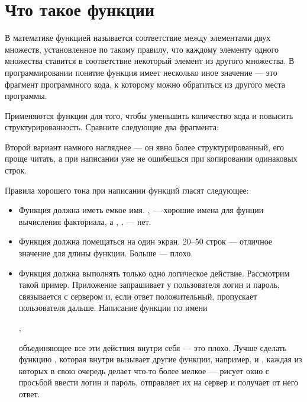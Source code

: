 \documentclass[book.tex]{subfiles}
\begin{document}



\maketitle

\section*{Что такое функции}

В математике функцией называется соответствие между элементами двух множеств, установленное по такому правилу, что каждому элементу одного множества ставится в соответствие некоторый элемент из другого множества. В программировании понятие функция имеет несколько иное значение --- это фрагмент программного кода, к которому можно обратиться из другого места программы.

Применяются функции для того, чтобы уменьшить количество кода и повысить структурированность. Сравните следующие два фрагмента:



Второй вариант намного нагляднее --- он явно более структурированный, его проще читать, а при написании уже не ошибешься при копировании одинаковых строк.

Правила хорошего тона при написании функций гласят следующее:

\begin{itemize}
\item Функция должна иметь емкое имя. ,  --- хорошие имена для фунции вычисления факториала, а , ,  --- нет.
\item Функция должна помещаться на один экран. 20--50 строк --- отличное значение для длины функции. Больше --- плохо.
\item Функция должна выполнять только одно логическое действие. Рассмотрим такой пример. Приложение запрашивает у пользователя логин и пароль, связывается с сервером и, если ответ положительный, пропускает пользователя дальше. Написание функции по имени 

, 

объединяющее все эти действия внутри себя --- это плохо. Лучше сделать функцию , которая внутри вызывает другие функции, например,  и , каждая из которых в свою очередь делает что-то более мелкое --- рисует окно с просьбой ввести логин и пароль, отправляет их на сервер и получает от него ответ.
\end{itemize}
\end{document}
